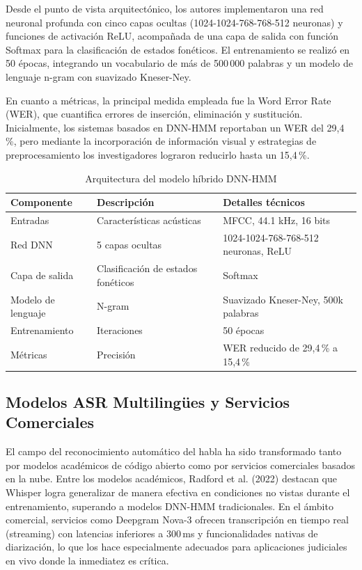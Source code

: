 \documentclass[12pt,a4paper,oneside]{report}
\begin{document}
Desde el punto de vista arquitectónico, los autores implementaron una red neuronal profunda con cinco capas ocultas (1024-1024-768-768-512 neuronas) y funciones de activación ReLU, acompañada de una capa de salida con función Softmax para la clasificación de estados fonéticos. El entrenamiento se realizó en 50 épocas, integrando un vocabulario de más de 500\,000 palabras y un modelo de lenguaje n-gram con suavizado Kneser-Ney.

En cuanto a métricas, la principal medida empleada fue la Word Error Rate (WER), que cuantifica errores de inserción, eliminación y sustitución. Inicialmente, los sistemas basados en DNN-HMM reportaban un WER del 29,4\,\%, pero mediante la incorporación de información visual y estrategias de preprocesamiento los investigadores lograron reducirlo hasta un 15,4\,\%.

\begin{table}[H]
\centering
\caption{Arquitectura del modelo híbrido DNN-HMM}
\begin{tabular}{|p{3.5cm}|p{4cm}|p{4cm}|}
\hline
\rowcolor{gray!20}
\textbf{Componente} & \textbf{Descripción} & \textbf{Detalles técnicos} \\
\hline
Entradas & Características acústicas & MFCC, 44.1 kHz, 16 bits \\
\hline
Red DNN & 5 capas ocultas & 1024-1024-768-768-512 neuronas, ReLU \\
\hline
Capa de salida & Clasificación de estados fonéticos & Softmax \\
\hline
Modelo de lenguaje & N-gram & Suavizado Kneser-Ney, 500k palabras \\
\hline
Entrenamiento & Iteraciones & 50 épocas \\
\hline
Métricas & Precisión & WER reducido de 29,4\,\% a 15,4\,\% \\
\hline
\end{tabular}
\label{tab:dnn_hmm}
\end{table}

\subsection{Modelos ASR Multilingües y Servicios Comerciales}

El campo del reconocimiento automático del habla ha sido transformado tanto por modelos académicos de código abierto como por servicios comerciales basados en la nube. Entre los modelos académicos, Radford et al. (2022) destacan que Whisper logra generalizar de manera efectiva en condiciones no vistas durante el entrenamiento, superando a modelos DNN-HMM tradicionales. En el ámbito comercial, servicios como Deepgram Nova-3 ofrecen transcripción en tiempo real (streaming) con latencias inferiores a 300\,ms y funcionalidades nativas de diarización, lo que los hace especialmente adecuados para aplicaciones judiciales en vivo donde la inmediatez es crítica.
\end{document}
